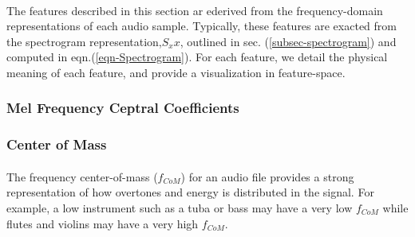 \documentclass[12pt,letterpaper]{article}
\begin{document}
\paragraph*{}The features described in this section ar ederived from the frequency-domain representations of each audio sample. Typically, these features are exacted from the spectrogram representation,$S_xx$, outlined in sec. (\ref{subsec-spectrogram}) and computed in eqn.(\ref{eqn-Spectrogram}). For each feature, we detail the physical meaning of each feature, and provide a visualization in feature-space.

\subsubsection{Mel Frequency Ceptral Coefficients}

\subsubsection{Center of Mass}

\paragraph*{}The frequency center-of-mass ($f_{CoM}$) for an audio file provides a strong representation of how overtones and energy is distributed in the signal. For example, a low instrument such as a tuba or bass may have a very low $f_{CoM}$ while flutes and violins may have a very high $f_{CoM}$.


\newpage
\end{document}
